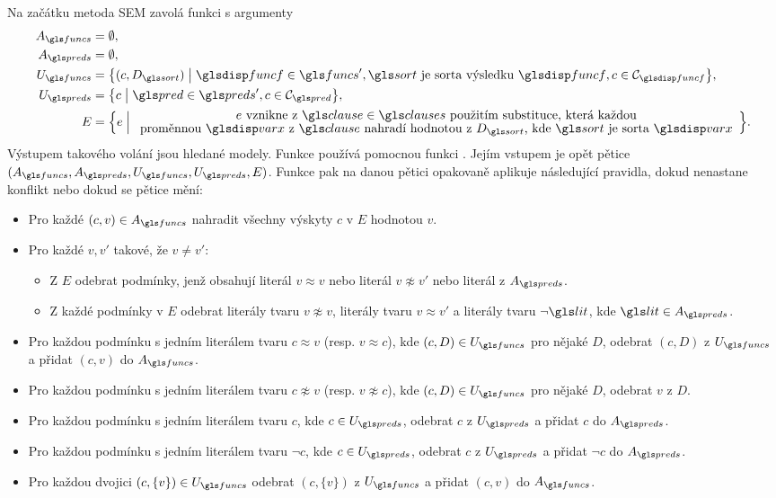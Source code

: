 Na začátku metoda SEM zavolá funkci  s argumenty
\begin{align*}
A_\funcs &= \emptyset, \\
A_\preds &= \emptyset, \\
U_\funcs &=
  \bigl\{ (c, D_\sort) \bigm|
    \func \in \funcs',
    \sort \text{ je sorta výsledku } \func,
    c \in \cells_\func \bigr\}, \\
U_\preds &=
  \bigl\{ c \bigm|
    \pred \in \preds',
    c \in \cells_\pred \bigr\}, \\
E &=
  \Bigl\{ e \Bigm|
    \array{c}
        e \text{ vznikne z $\clause \in \clauses$ použitím substituce,
                která každou} \\[-0.3ex]
      \text{proměnnou $\var$ z $\clause$ nahradí hodnotou z $D_\sort$, kde $\sort$
            je sorta $\var$}
    \endarray
    \Bigr\}.
\end{align*}
Výstupem takového volání jsou hledané modely.
Funkce  používá pomocnou funkci .
Jejím vstupem je opět pětice
$(A_\funcs, A_\preds, U_\funcs, U_\preds, E)$.
Funkce  pak na danou pětici opakovaně
aplikuje ná\-sle\-du\-jící pravidla, dokud nenastane konflikt nebo
dokud se pětice mění:
\begin{itemize}
\item Pro každé $(c, v) \in A_\funcs$ nahradit všechny výskyty $c$ v $E$
  hodnotou $v$.
\item Pro každé $v, v'$ takové, že $v \neq v'$:
  \begin{itemize}
  \item Z $E$ odebrat podmínky, jenž obsahují literál $v \approx v$
    nebo literál $v \not\approx v'$ nebo literál z $A_\preds$.
  \item Z každé podmínky v $E$ odebrat literály tvaru $v \not\approx v$,
    literály tvaru $v \approx v'$ a literály tvaru $\neg \lit$,
    kde $\lit \in A_\preds$.
  \end{itemize}
\item Pro každou podmínku s jedním literálem tvaru $c \approx v$
  (resp. $v \approx c$),
  kde $(c, D) \in U_\funcs$ pro nějaké $D$,
  odebrat $(c, D)$ z $U_\funcs$
  a přidat $(c, v)$ do $A_\funcs$.
\item Pro každou podmínku s jedním literálem tvaru $c \not\approx v$
  (resp. $v \not\approx c$),
  kde $(c, D) \in U_\funcs$ pro nějaké $D$,
  odebrat $v$ z $D$.
\item Pro každou podmínku s jedním literálem tvaru $c$,
  kde $c \in U_\preds$,
  odebrat $c$ z $U_\preds$
  a přidat $c$ do $A_\preds$.
\item Pro každou podmínku s jedním literálem tvaru $\neg c$,
  kde $c \in U_\preds$,
  odebrat $c$ z $U_\preds$
  a přidat $\neg c$ do $A_\preds$.
\item Pro každou dvojici $(c, \{ v \}) \in U_\funcs$
  odebrat $(c, \{ v \})$ z $U_\funcs$
  a přidat $(c, v)$ do $A_\funcs$.
\end{itemize}

